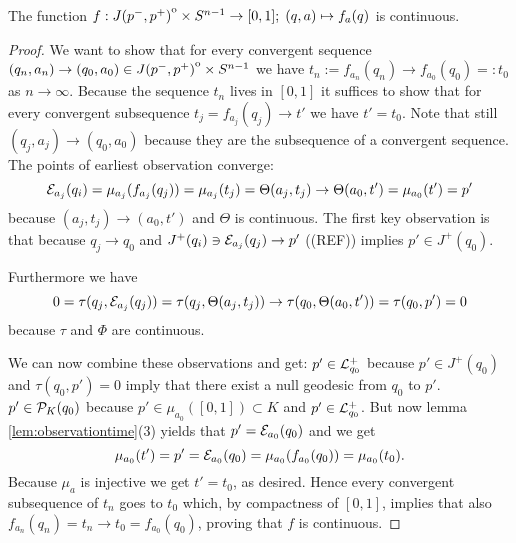 \begin{proposition}\label{prop:fcont} 
    The function $f:{\kern0ptJ(p^-,p^+)}^{\mathrm{o}}\times{S^{n-1}}\to[0,1];\; (q,a)\mapsto f_a(q)$ is continuous.
\end{proposition}
\begin{proof}
    We want to show that for every convergent sequence $(q_n,a_n)\to (q_0,a_0)\in {\kern0ptJ(p^-,p^+)}^{\mathrm{o}}\times {S^{n-1}}$ we have $t_n:=f_{a_n}(q_n)\to f_{a_0}(q_0)=:t_0$ as $n \to \infty$. Because the sequence $t_n$ lives in $[0,1]$ it suffices to show that for every convergent subsequence $t_j = f_{a_j}(q_j) \to t'$ we have $t'=t_0$. Note that still $(q_j,a_j)\to (q_0,a_0)$ because they are the subsequence of a convergent sequence. The points of earliest observation converge:
    \[
        {\mathcal{E}}_{a_j}(q_i) = \mu_{a_j}(f_{a_j}(q_j)) = \mu_{a_j}(t_j) = \Theta(a_j,t_j) \to \Theta(a_0,t') = \mu_{a_0}(t')=p'
    \] because $(a_j,t_j)\to (a_0,t')$ and $\Theta$ is continuous.
    The first key observation is that  because $q_j\to q_0$ and $J^+(q_i)\ni{\mathcal{E}}_{a_j}(q_j) \to  p'$ ((REF)) implies $p'\in J^+(q_0)$.

    Furthermore we have
    \[
        0=\tau(q_j,{\mathcal{E}}_{a_j}(q_j))=\tau(q_j,\Theta(a_j,t_j))\to \tau(q_0,\Theta(a_0,t')) = \tau(q_0,p')=0
    \] because $\tau$ and $\Phi$ are continuous.

    We can now combine these observations and get: $p'\in {\mathcal{L}}^+_{q_0}$ because $p'\in J^+(q_0)$ and $\tau(q_0,p')=0$ imply that there exist a null geodesic from $q_0$ to $p'$. $p'\in {\mathcal{P}}_K(q_0)$ because $p'\in \mu_{a_0}([0,1])\subset K$ and $p'\in {\mathcal{L}}^+_{q_0}$. But now lemma \ref{lem:observationtime}(3) yields that $p'={\mathcal{E}}_{a_0}(q_0)$ and we get 
    \[
        \mu_{a_0}(t') = p' = {\mathcal{E}}_{a_0}(q_0) = \mu_{a_0}(f_{a_0}(q_0))= \mu_{a_0}(t_0).
    \]
    Because $\mu_a$ is injective we get $t'=t_0$, as desired. Hence every convergent subsequence of $t_n$ goes to $t_0$ which, by compactness of $[0,1]$, implies that also $f_{a_n}(q_n)=t_n \to t_0 = f_{a_0}(q_0)$, proving that $f$ is continuous.
\end{proof}

